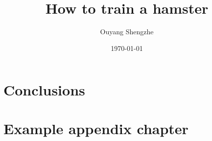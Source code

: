 \documentclass[ a4paper,
                oneside,
                toc=bibliography,
                toc=listof
                ]{scrbook}
\author{Ouyang Shengzhe}
\title{How to train a hamster}
\date{\today}
\begin{document}
 
    \frontmatter
    \makeISWtitle

	\cleardoublepage
	\setcounter{page}{1} %
    \declarationOfOriginality

    
    
    \cleardoublepage
    \tableofcontents
       

    \mainmatter
    


    
    
    
    
    
    
    
    
    \chapter{Conclusions}

    
    \cleardoublepage
    \printbibliography
    
     \cleardoublepage
    
    
    \cleardoublepage
    \listoffigures
    
    \cleardoublepage
    \listoftables
    
    
    
    \appendix
    \chapter{Example appendix chapter}
\end{document}
